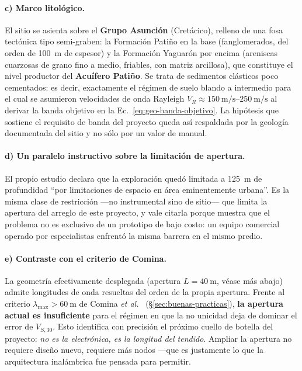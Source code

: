 \paragraph{c) Marco litol\'ogico.} El sitio se asienta sobre el \textbf{Grupo Asunci\'on}
(Cret\'acico), relleno de una fosa tect\'onica tipo semi-graben: la Formaci\'on Pati\~no
en la base (fanglomerados, del orden de \SI{100}{\meter} de espesor) y la Formaci\'on
Yaguar\'on por encima (areniscas cuarzosas de grano fino a medio, friables, con matriz
arcillosa), que constituye el nivel productor del \textbf{Acu\'ifero Pati\~no}. Se trata
de sedimentos cl\'asticos poco cementados: es decir, exactamente el r\'egimen de suelo
blando a intermedio para el cual se asumieron velocidades de onda Rayleigh
$V_R\approx\SIrange{150}{250}{\meter\per\second}$ al derivar la banda objetivo en la
Ec.~\eqref{eq:geo-banda-objetivo}. La hip\'otesis que sostiene el requisito de banda del
proyecto queda as\'i respaldada por la geolog\'ia documentada del sitio y no s\'olo por un
valor de manual.

\paragraph{d) Un paralelo instructivo sobre la limitaci\'on de apertura.} El propio
estudio declara que la exploraci\'on qued\'o limitada a \SI{125}{\meter} de profundidad
``por limitaciones de espacio en \'area eminentemente urbana''. Es la misma clase de
restricci\'on ---no instrumental sino de sitio--- que limita la apertura del arreglo de
este proyecto, y vale citarla porque muestra que el problema no es exclusivo de un
prototipo de bajo costo: un equipo comercial operado por especialistas enfrent\'o la
misma barrera en el mismo predio.

\paragraph{e) Contraste con el criterio de Comina.} La geometr\'ia efectivamente
desplegada (apertura $L=\SI{40}{\meter}$, v\'ease m\'as abajo) admite longitudes de onda
resueltas del orden de la propia apertura. Frente al criterio
$\lambda_{\max}>\SI{60}{\meter}$ de Comina \emph{et al.}~\cite{Comina2011}
(\S\ref{sec:buenas-practicas}), \textbf{la apertura actual es insuficiente} para el
r\'egimen en que la no unicidad deja de dominar el error de $V_{S,30}$. Esto identifica
con precisi\'on el pr\'oximo cuello de botella del proyecto: \emph{no es la electr\'onica,
es la longitud del tendido}. Ampliar la apertura no requiere diseño nuevo, requiere m\'as
nodos ---que es justamente lo que la arquitectura inal\'ambrica fue pensada para
permitir.

